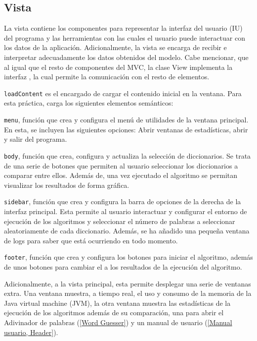 \subsection{Vista}

La vista contiene los componentes para representar la interfaz del usuario (IU) del programa y las herramientas con las cuales el usuario puede interactuar con los datos de la aplicación. Adicionalmente, la vista se encarga de recibir e interpretar adecuadamente los datos obtenidos del modelo. Cabe mencionar, que al igual que el resto de componentes del MVC, la clase View implementa la interfaz , la cual permite la comunicación con el resto de elementos.\bigskip

\texttt{loadContent} es el encargado de cargar el contenido inicial en la ventana. Para esta práctica, carga los siguientes elementos semánticos:\bigskip

\texttt{menu}, función que crea y configura el menú de utilidades de la ventana principal. En esta, se incluyen las siguientes opciones: Abrir ventanas de estadísticas, abrir  y salir del programa.\bigskip

\texttt{body}, función que crea, configura y actualiza la selección de diccionarios. Se trata de una serie de botones que permiten al usuario seleccionar los diccionarios a comparar entre ellos. Además de, una vez ejecutado el algoritmo se permitan visualizar los resultados de forma gráfica.\bigskip

\texttt{sidebar}, función que crea y configura la barra de opciones de la derecha de la interfaz principal. Esta permite al usuario interactuar y configurar el entorno de ejecución de los algoritmos y seleccionar el número de palabras a seleccionar aleatoriamente de cada diccionario. Además, se ha añadido una pequeña ventana de logs para saber que está ocurriendo en todo momento.\bigskip

\texttt{footer}, función que crea y configura los botones para iniciar el algoritmo, además de unos botones para cambiar el  a los resultados de la ejecución del algoritmo.

Adicionalmente, a la vista principal, esta permite desplegar una serie de ventanas extra. Una ventana muestra, a tiempo real, el uso y consumo de la memoria de la Java virtual machine (JVM), la otra ventana muestra las estadísticas de la ejecución de los algoritmos además de su comparación, una para abrir el Adivinador de palabras (\ref{Word Guesser}) y un manual de usuario (\ref{Manual usuario, Header}).\bigskip

